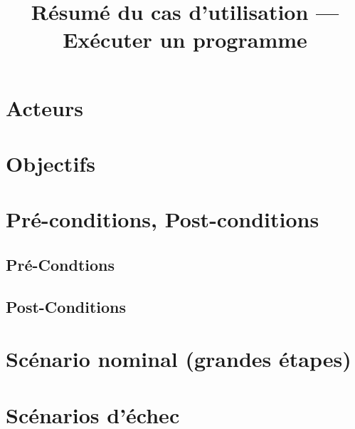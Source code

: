 \documentclass[12pt,a4paper]{article}
\title{Résumé du cas d'utilisation --- Exécuter un programme} %
\date{} %
\author{} %
\begin{document}
        \maketitle

        \section{Acteurs}

        \section{Objectifs}

        \section{Pré-conditions, Post-conditions}

            \subsection{Pré-Condtions}

            \subsection{Post-Conditions}

        \section{Scénario nominal (grandes étapes)}

        \section{Scénarios d'échec}

    
\end{document}
